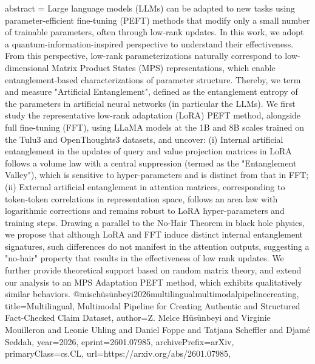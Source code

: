 {      abstract = {Large language models (LLMs) can be adapted to new tasks using parameter-efficient fine-tuning (PEFT) methods that modify only a small number of trainable parameters, often through low-rank updates. In this work, we adopt a quantum-information-inspired perspective to understand their effectiveness. From this perspective, low-rank parameterizations naturally correspond to low-dimensional Matrix Product States (MPS) representations, which enable entanglement-based characterizations of parameter structure. Thereby, we term and measure "Artificial Entanglement", defined as the entanglement entropy of the parameters in artificial neural networks (in particular the LLMs). We first study the representative low-rank adaptation (LoRA) PEFT method, alongside full fine-tuning (FFT), using LLaMA models at the 1B and 8B scales trained on the Tulu3 and OpenThoughts3 datasets, and uncover: (i) Internal artificial entanglement in the updates of query and value projection matrices in LoRA follows a volume law with a central suppression (termed as the "Entanglement Valley"), which is sensitive to hyper-parameters and is distinct from that in FFT; (ii) External artificial entanglement in attention matrices, corresponding to token-token correlations in representation space, follows an area law with logarithmic corrections and remains robust to LoRA hyper-parameters and training steps. Drawing a parallel to the No-Hair Theorem in black hole physics, we propose that although LoRA and FFT induce distinct internal entanglement signatures, such differences do not manifest in the attention outputs, suggesting a "no-hair" property that results in the effectiveness of low rank updates. We further provide theoretical support based on random matrix theory, and extend our analysis to an MPS Adaptation PEFT method, which exhibits qualitatively similar behaviors.}
}@misc{hüsünbeyi2026multilingualmultimodalpipelinecreating,
      title={Multilingual, Multimodal Pipeline for Creating Authentic and Structured Fact-Checked Claim Dataset}, 
      author={Z. Melce Hüsünbeyi and Virginie Mouilleron and Leonie Uhling and Daniel Foppe and Tatjana Scheffler and Djamé Seddah},
      year={2026},
      eprint={2601.07985},
      archivePrefix={arXiv},
      primaryClass={cs.CL},
      url={https://arxiv.org/abs/2601.07985},
}
